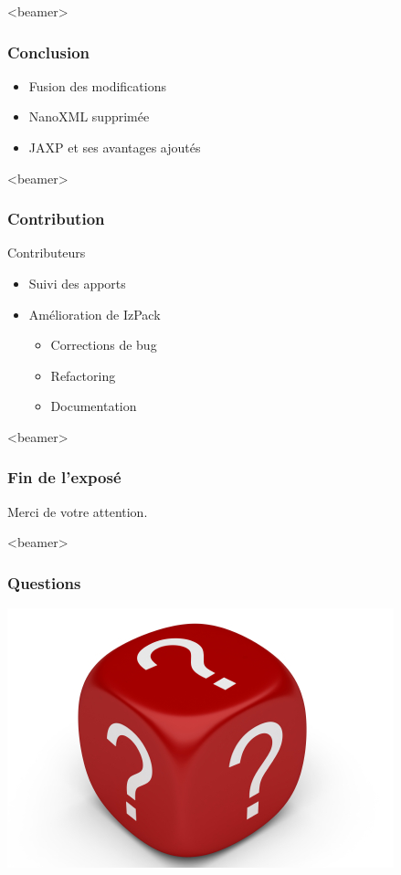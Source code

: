 \begin{frame}<beamer>
\frametitle{Conclusion}
\begin{itemize}
	\item Fusion des modifications
	\item NanoXML supprimée
	\item JAXP et ses avantages ajoutés
\end{itemize}
\end{frame}
\begin{frame}<beamer>
\frametitle{Contribution}
\begin{beamerboxesrounded}[shadow=true]{Contributeurs}
\begin{itemize}
	\item Suivi des apports
	\item Amélioration de IzPack
	\begin{itemize}
		\item Corrections de bug
		\item Refactoring
		\item Documentation
	\end{itemize}
\end{itemize}
\end{beamerboxesrounded}
\end{frame}
\begin{frame}<beamer>\frametitle{Fin de l'exposé}
\begin{center}
\LARGE Merci de votre attention.
\end{center}
\end{frame}
\begin{frame}<beamer>\frametitle{Questions}
\begin{center}
\includegraphics[width=.6\linewidth]{../image/questionMark.jpg}
\end{center}
\end{frame}
